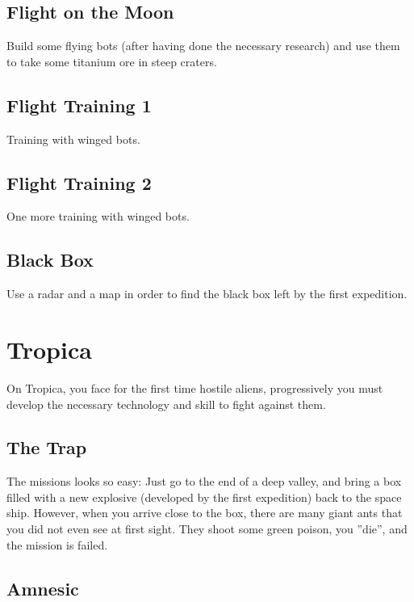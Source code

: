 \subsection{Flight on the Moon}

Build some flying bots (after having done the necessary research) and use them to take some titanium ore in steep craters.


\subsection{Flight Training 1}

Training with winged bots.


\subsection{Flight Training 2}

One more training with winged bots.


\subsection{Black Box}

Use a radar and a map in order to find the black box left by the first expedition.


\newpage
\section{Tropica}

On Tropica, you face for the first time hostile aliens, progressively you must develop the necessary technology and skill to fight against them.


\subsection{The Trap}

The missions looks so easy: Just go to the end of a deep valley, and bring a box filled with a new explosive (developed by the first expedition) back to the space ship. However, when you arrive close to the box, there are many giant ants that you did not even see at first sight. They shoot some green poison, you ''die'', and the mission is failed.


\subsection{Amnesic}

